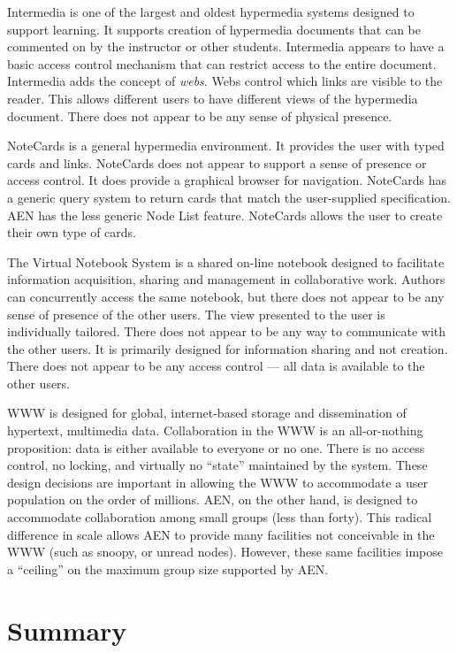 Intermedia is one of the largest and oldest hypermedia systems
  designed to support learning.  It supports creation of hypermedia documents
  that can be commented on by the instructor or other students.  Intermedia
  appears to have a basic access control mechanism that can restrict access to
  the entire document.  Intermedia adds the concept of {\em webs}.  Webs
  control which links are visible to the reader.  This allows different users
  to have different views of the hypermedia document.  There does not appear
  to be any sense of physical presence.

NoteCards is a general hypermedia environment.  It
  provides the user with typed cards and links.  NoteCards does not
  appear to support a sense of presence or access control.  It does
  provide a graphical browser for navigation.  NoteCards has a generic
  query system to return cards that match the user-supplied
  specification.  AEN has the less generic Node List feature.  NoteCards
  allows the user to create their own type of cards.


The Virtual Notebook System is a shared on-line
  notebook designed to facilitate information acquisition, sharing and
  management in collaborative work.  Authors can concurrently access the
  same notebook, but there does not appear to be any sense of presence of
  the other users.  The view presented to the user is individually
  tailored.  There does not appear to be any way to communicate with the
  other users.  It is primarily designed for information sharing and not
  creation.  There does not appear to be any access control --- all data is
  available to the other users.

WWW is designed for global, internet-based storage
  and dissemination of hypertext, multimedia data.  Collaboration in the WWW is
  an all-or-nothing proposition: data is either available to everyone or no
  one. There is no access control, no locking, and virtually no ``state''
  maintained by the system.  These design decisions are important in allowing
  the WWW to accommodate a user population on the order of millions.  AEN, on
  the other hand, is designed to accommodate collaboration among small groups
  (less than forty).  This radical difference in scale allows AEN to
  provide many facilities not conceivable in the WWW (such as snoopy, or unread
  nodes).  However, these same facilities impose a ``ceiling'' on the maximum
  group size supported by AEN.

\section{Summary}

